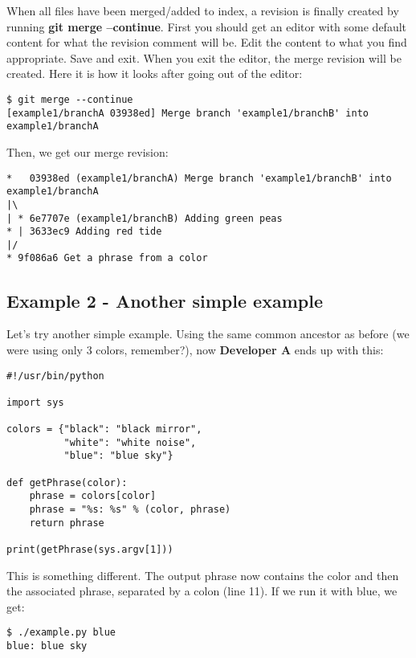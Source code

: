 When all files have been merged/added to index, a revision is finally created by running {\bf git merge --continue}. First
you should get an editor with some default content for what the revision comment will be.
Edit the content to what you find appropriate. Save and exit. When you exit the editor, the merge revision will be created.
Here it is how it looks after going out of the editor:
\begin{lstlisting}[style=console_style, caption={\bf git merge --continue}]
$ git merge --continue
[example1/branchA 03938ed] Merge branch 'example1/branchB' into example1/branchA
\end{lstlisting}

Then, we get our merge revision:
\begin{lstlisting}[style=console_style, caption={\bf example 1} - final branch history]
*   03938ed (example1/branchA) Merge branch 'example1/branchB' into example1/branchA
|\  
| * 6e7707e (example1/branchB) Adding green peas
* | 3633ec9 Adding red tide
|/  
* 9f086a6 Get a phrase from a color
\end{lstlisting}


\subsection{Example 2 - Another simple example}
\label{example_02}

Let's try another simple example. Using the same common ancestor as before (we were using only 3 colors, remember?),
now {\bf Developer A} ends up with this:
\begin{lstlisting}[style=python_style, caption={\bf example 2} - Developer A]
#!/usr/bin/python

import sys

colors = {"black": "black mirror",
          "white": "white noise",
          "blue": "blue sky"}

def getPhrase(color):
    phrase = colors[color]
    phrase = "%s: %s" % (color, phrase)
    return phrase

print(getPhrase(sys.argv[1]))
\end{lstlisting}

This is something different. The output phrase now contains the color and then the associated phrase,
separated by a colon (line 11). If we run it with blue, we get:
\begin{lstlisting}[style=console_style, caption={\bf example 2} - running script from Developer A]
$ ./example.py blue
blue: blue sky
\end{lstlisting}

